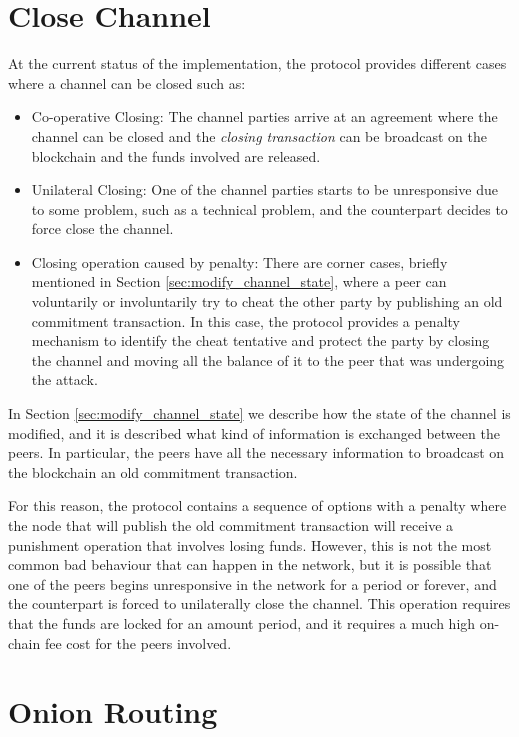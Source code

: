 \section{Close {\LN} Channel}
\label{sec:close_operation}

At the current status of the implementation, the {\LN} protocol provides different cases where a channel can be closed such as:

\begin{itemize}
  \item Co-operative Closing: The channel parties arrive at an agreement where the channel can be closed and the
        \emph{closing transaction} can be broadcast on the blockchain and the funds involved are released.
  \item Unilateral Closing: One of the channel parties starts to be unresponsive due to some problem, such as a technical problem, and the counterpart decides to force close the channel.
  
  \item Closing operation caused by penalty: There are corner cases, briefly mentioned in Section \ref{sec:modify_channel_state}, where a peer can voluntarily or involuntarily try to cheat the other party by publishing an old commitment transaction. In this case, the protocol provides a penalty mechanism to identify the cheat tentative and protect the party by closing the channel and moving all the balance of it to the peer that was undergoing the attack.
\end{itemize}

In Section \ref{sec:modify_channel_state} we describe how the state of the channel is modified, and it is described what kind of information is
exchanged between the peers. In particular, the peers have all the necessary information to broadcast on the blockchain an old commitment transaction.

For this reason, the protocol contains a sequence of options with a penalty where the node that will publish the old commitment transaction
will receive a punishment operation that involves losing funds. However, this is not the most common bad behaviour that can happen in
the network, but it is possible that one of the peers begins unresponsive in the network for a period or forever, and the counterpart is forced to unilaterally close the channel. This operation
requires that the funds are locked for an amount period, and it requires a much high on-chain fee cost for the peers involved.

\section{Onion Routing}\label{sec:onion_routing}

